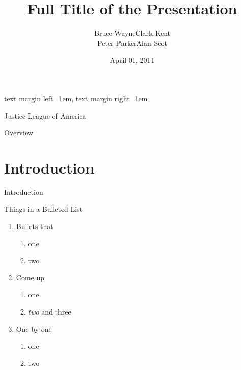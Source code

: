 \usepackage[english] {babel}
\usepackage[T1]      {fontenc}

\usepackage{amsmath, amsfonts, graphicx}
\usepackage{bibunits, tikz}


\setbeamersize
  {text margin left=1em, text margin right=1em}

\title
  [Short Title]
  {Full Title of the Presentation}

\author
  [Bruce Wayne]
  {Bruce Wayne\quad Clark Kent\\Peter Parker\quad Alan Scot}

\date
  {April 01, 2011}

\institute
  {Justice League of America}



\maketitle

\begin{frame}{Overview}

  \tableofcontents

\end{frame}

\section
  {Introduction}

\begin{frame}
  {Introduction}

  Things in a Bulleted List\pause

  \begin{enumerate}
  \item Bullets that
    \begin{enumerate}
    \item one
    \item two
    \end{enumerate}\pause
  \item Come up
    \begin{enumerate}
    \item one
    \item \emph{two} and three
    \end{enumerate}\pause
  \item One by one
    \begin{enumerate}
    \item one
    \item two
    \end{enumerate}
  \end{enumerate}
\end{frame}


